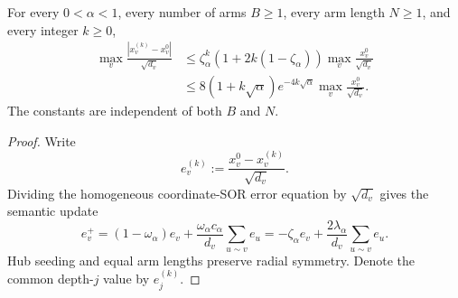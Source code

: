 \begin{theorem}
\label{thm:radial-semantic-damping}
For every $0<\alpha<1$, every number of arms $B\geq1$, every arm length
$N\geq1$, and every integer $k\geq0$,
\begin{align}
 \max_v\frac{|x_v^{(k)}-x_v^0|}{\sqrt{d_v}}
 &\leq
 \zeta_\alpha^k
 \left(1+2k(1-\zeta_\alpha)\right)
 \max_v\frac{x_v^0}{\sqrt{d_v}}
 \label{eq:radial-semantic-exact-envelope}\\
 &\leq
 8(1+k\sqrt\alpha)e^{-4k\sqrt\alpha}
 \max_v\frac{x_v^0}{\sqrt{d_v}}.
 \label{eq:radial-semantic-exponential-envelope}
\end{align}
The constants are independent of both $B$ and $N$.
\end{theorem}

\begin{proof}
Write
\begin{equation*}
 e_v^{(k)}:=
 \frac{x_v^0-x_v^{(k)}}{\sqrt{d_v}}.
\end{equation*}
Dividing the homogeneous coordinate-SOR error equation by $\sqrt{d_v}$
gives the semantic update
\begin{equation}
 e_v^+=(1-\omega_\alpha)e_v
 +\frac{\omega_\alpha c_\alpha}{d_v}
   \sum_{u\sim v}e_u
 =-\zeta_\alpha e_v
 +\frac{2\lambda_\alpha}{d_v}
   \sum_{u\sim v}e_u.
 \label{eq:radial-semantic-coordinate-update}
\end{equation}
Hub seeding and equal arm lengths preserve radial symmetry.  Denote the
common depth-$j$ value by $e_j^{(k)}$.


\end{proof}

